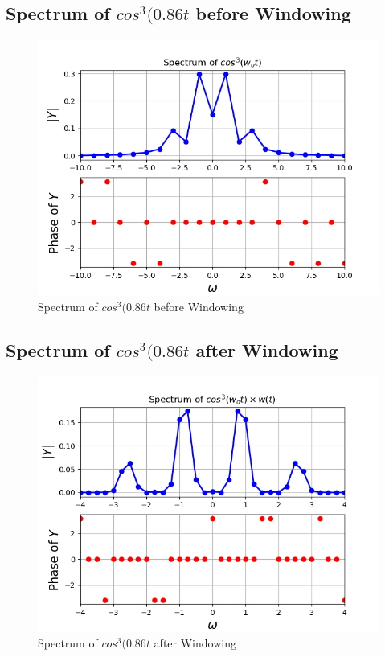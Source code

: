 \documentclass[11pt]{article}
\begin{document}
\subsection{Spectrum of $cos^3(0.86t$ before Windowing}
\begin{figure}[H]
    \centering
    \includegraphics[scale = 0.75]{Figure_6.png}
    \caption{Spectrum of $cos^3(0.86t$ before Windowing}
\end{figure}

\subsection{Spectrum of $cos^3(0.86t$ after Windowing}
\begin{figure}[H]
    \centering
    \includegraphics[scale = 0.75]{Figure_7.png}
    \caption{Spectrum of $cos^3(0.86t$ after Windowing}
\end{figure}
\end{document}
